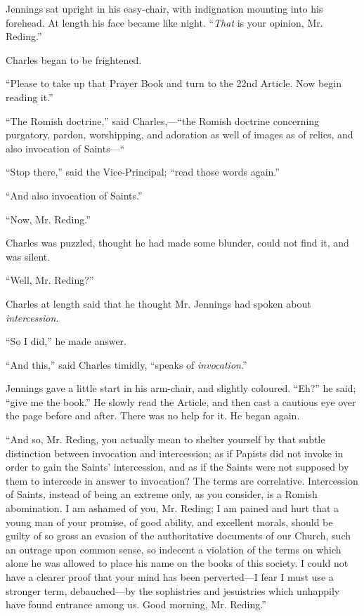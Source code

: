 Jennings sat upright in his easy-chair, with indignation mounting
into his forehead. At length his face became like night. ``\emph{That}
is your opinion, Mr. Reding.''

Charles began to be frightened.

``Please to take up that Prayer Book and turn to the 22nd
Article. Now begin reading it.''

``The Romish doctrine,'' said Charles,—``the Romish
doctrine concerning purgatory, pardon, worshipping, and adoration as
well of images as of relics, and also invocation of Saints—``

``Stop there,'' said the Vice-Principal; ``read those
words again.''

``And also invocation of Saints.''

``Now, Mr. Reding.''

Charles was puzzled, thought he had made some blunder, could not
find it, and was silent.

``Well, Mr. Reding?''

Charles at length said that he thought Mr. Jennings had spoken
about \emph{intercession}.

``So I did,'' he made answer.

``And this,'' said Charles timidly, ``speaks of \emph{invocation}.''

Jennings gave a little start in his arm-chair, and slightly
coloured. ``Eh?'' he said; ``give me the book.'' He
slowly read the Article, and then cast a cautious eye over the page
before and after. There was no help for it. He began again.

``And so, Mr. Reding, you actually mean to shelter yourself by
that subtle distinction between invocation and intercession; as if
Papists did not invoke in order to gain the Saints' intercession, and
as if the Saints were not supposed by them to intercede in answer to
invocation? The terms are correlative. Intercession of Saints, instead
of being an extreme only, as you consider, is a Romish abomination. I
am ashamed of you, Mr. Reding; I am pained and hurt that a young
man of your promise, of good ability, and excellent morals, should be
guilty of so gross an evasion of the authoritative documents of our
Church, such an outrage upon common sense, so indecent a violation of
the terms on which alone he was allowed to place his name on the books
of this society. I could not have a clearer proof that your mind has
been perverted—I fear I must use a stronger term, debauched—by the
sophistries and jesuistries which unhappily have found entrance among
us. Good morning, Mr. Reding.''

